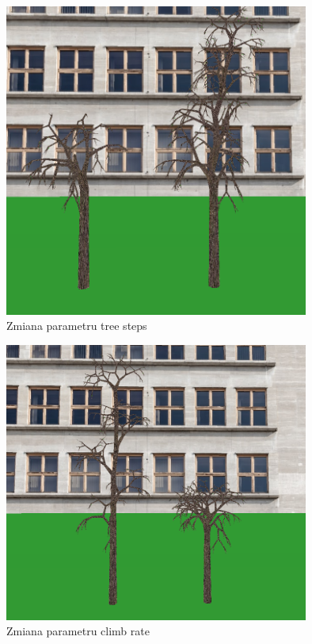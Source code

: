 \documentclass[a4paper,twoside,12pt]{report}
\begin{document}
\begin{figure}[H]
	\centering\includegraphics[width=10cm]{grafika/params/TreeSteps.png}
	\caption{Zmiana parametru tree steps}
    \label{fig:treeSteps}
\end{figure}

\begin{figure}[H]
	\centering\includegraphics[width=10cm]{grafika/params/ClimbRate.png}
	\caption{Zmiana parametru climb rate}
    \label{fig:climbRate}
\end{figure}
\end{document}
